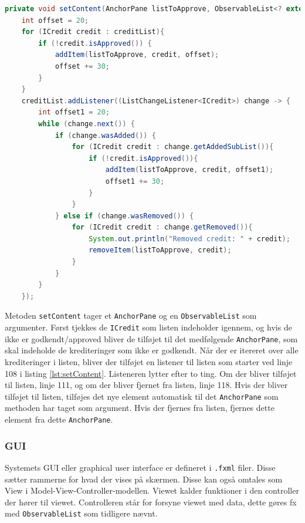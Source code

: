 \begin{lstlisting}[language=Java, firstnumber=100, label=lst:setContent, caption = Funktionen
setContet sætter listen og hvordan denne opdateres]
private void setContent(AnchorPane listToApprove, ObservableList<? extends ICredit> creditList){
    int offset = 20;
    for (ICredit credit : creditList){
        if (!credit.isApproved()) {
            addItem(listToApprove, credit, offset);
            offset += 30;
        }
    }
    creditList.addListener((ListChangeListener<ICredit>) change -> {
        int offset1 = 20;
        while (change.next()) {
            if (change.wasAdded()) {
                for (ICredit credit : change.getAddedSubList()){
                    if (!credit.isApproved()){
                        addItem(listToApprove, credit, offset1);
                        offset1 += 30;
                    }
                }
            } else if (change.wasRemoved()) {
                for (ICredit credit : change.getRemoved()){
                    System.out.println("Removed credit: " + credit);
                    removeItem(listToApprove, credit);
                }
            }
        }
    });
\end{lstlisting}

Metoden \texttt{setContent} tager et \texttt{AnchorPane} og en
\texttt{ObservableList} som argumenter. Først tjekkes de \texttt{ICredit} som
listen indeholder igennem, og hvis de ikke er godkendt/approved bliver de
tilføjet til det medfølgende \texttt{AnchorPane}, som skal indeholde de krediteringer som
ikke er godkendt. Når der er itereret over alle krediteringer i listen, bliver
der tilføjet en listener til listen som starter ved linje 108 i listing
\ref{lst:setContent}. Listeneren lytter efter to ting. Om der bliver tilføjet
til listen, linje 111, og om der bliver fjernet fra listen, linje 118. Hvis der
bliver tilføjet til listen, tilføjes det nye element automatisk til det
\texttt{AnchorPane} som methoden har taget som argument. Hvis der fjernes fra listen,
fjernes dette element fra dette \texttt{AnchorPane}.

\subsubsection{GUI}%
\label{ssub:gui}

Systemets GUI eller graphical user interface er defineret i \texttt{.fxml}
filer. Disse sætter rammerne for hvad der vises på skærmen. Disse kan også
omtales som View i Model-View-Controller-modellen. Viewet kalder
funktioner i den controller der hører til viewet. Controlleren står for forsyne
viewet med data, dette gøres fx med \texttt{ObservableList} som tidligere nævnt.

